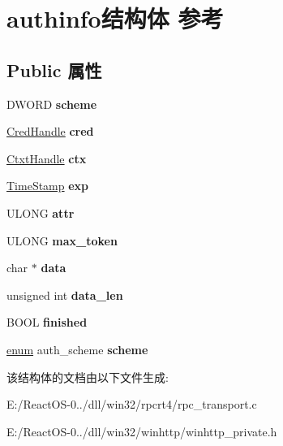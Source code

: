 \hypertarget{structauthinfo}{}\section{authinfo结构体 参考}
\label{structauthinfo}
\subsection*{Public 属性}
\begin{DoxyCompactItemize}
\item 
\mbox{\label{structauthinfo_a9e8de3b5e2e32e241f33bf0f17391e54}} 
D\+W\+O\+RD {\bfseries scheme}
\item 
\mbox{\label{structauthinfo_ac40b1cf9beadb0cc434650e32706041e}} 
\hyperlink{struct___sec_handle}{Cred\+Handle} {\bfseries cred}
\item 
\mbox{\label{structauthinfo_ac6b24bc2daf68489f643e5ed917b1fbf}} 
\hyperlink{struct___sec_handle}{Ctxt\+Handle} {\bfseries ctx}
\item 
\mbox{\label{structauthinfo_acef557299e2710d93ea6b52980b7b40d}} 
\hyperlink{struct___s_e_c_u_r_i_t_y___i_n_t_e_g_e_r}{Time\+Stamp} {\bfseries exp}
\item 
\mbox{\label{structauthinfo_af8ab11758589835423a5470e50b3f942}} 
U\+L\+O\+NG {\bfseries attr}
\item 
\mbox{\label{structauthinfo_af0ef87ab00ab5bccefec57fcec37ad7d}} 
U\+L\+O\+NG {\bfseries max\+\_\+token}
\item 
\mbox{\label{structauthinfo_a230a5640990cdc6e291188aa3d4d06a4}} 
char $\ast$ {\bfseries data}
\item 
\mbox{\label{structauthinfo_ad556ce353cd27aff3e613d0a673b475f}} 
unsigned int {\bfseries data\+\_\+len}
\item 
\mbox{\label{structauthinfo_a937f8c7c237d897cbe08ee12260fccbc}} 
B\+O\+OL {\bfseries finished}
\item 
\mbox{\label{structauthinfo_a22bddea8c9b7d548c1d7fe53f81dd318}} 
\hyperlink{interfaceenum}{enum} auth\+\_\+scheme {\bfseries scheme}
\end{DoxyCompactItemize}


该结构体的文档由以下文件生成\+:\begin{DoxyCompactItemize}
\item 
E\+:/\+React\+O\+S-\/0../dll/win32/rpcrt4/rpc\+\_\+transport.\+c\item 
E\+:/\+React\+O\+S-\/0../dll/win32/winhttp/winhttp\+\_\+private.\+h\end{DoxyCompactItemize}
